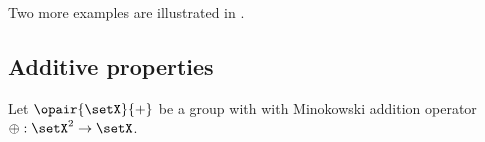 \begin{example}
\label{ex:mph_circle+square}
Two more examples are illustrated in .
\end{example}








\subsection{Additive properties}


\begin{theorem}
\label{thm:mph_add}
Let $\opair{\setX}{+}$ be a group with with Minokowski addition operator $\oplus:\setX^2\to\setX$.
\end{theorem}
